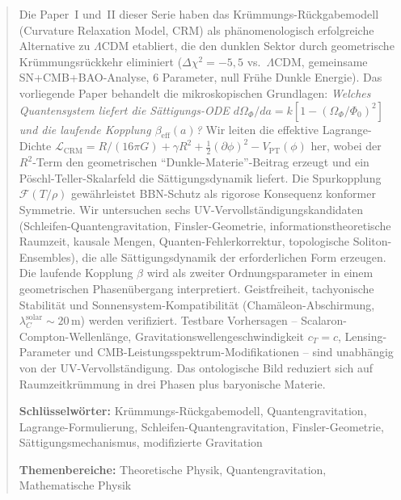 \documentclass[11pt,a4paper]{article}
\begin{document}
\begin{abstract}
\noindent Die Paper~I und~II dieser Serie haben das Kr\"ummungs-R\"uckgabemodell (Curvature Relaxation Model, CRM) als ph\"anomenologisch erfolgreiche Alternative zu $\Lambda$CDM etabliert, die den dunklen Sektor durch geometrische Kr\"ummungsr\"uckkehr eliminiert ($\Delta\chi^2 = -5{,}5$ vs.\ $\Lambda$CDM, gemeinsame SN+CMB+BAO-Analyse, 6 Parameter, null Fr\"uhe Dunkle Energie). Das vorliegende Paper behandelt die mikroskopischen Grundlagen: \textit{Welches Quantensystem liefert die S\"attigungs-ODE $d\Omega_\Phi/da = k[1-(\Omega_\Phi/\Phi_0)^2]$ und die laufende Kopplung $\beta_{\mathrm{eff}}(a)$?} Wir leiten die effektive Lagrange-Dichte $\mathcal{L}_{\mathrm{CRM}} = R/(16\pi G) + \gamma R^2 + \frac{1}{2}(\partial\phi)^2 - V_{\mathrm{PT}}(\phi)$ her, wobei der $R^2$-Term den geometrischen ``Dunkle-Materie''-Beitrag erzeugt und ein P\"oschl-Teller-Skalarfeld die S\"attigungsdynamik liefert. Die Spurkopplung $\mathcal{F}(T/\rho)$ gew\"ahrleistet BBN-Schutz als rigorose Konsequenz konformer Symmetrie. Wir untersuchen sechs UV-Vervollst\"andigungskandidaten (Schleifen-Quantengravitation, Finsler-Geometrie, informationstheoretische Raumzeit, kausale Mengen, Quanten-Fehlerkorrektur, topologische Soliton-Ensembles), die alle S\"attigungsdynamik der erforderlichen Form erzeugen. Die laufende Kopplung $\beta$ wird als zweiter Ordnungsparameter in einem geometrischen Phasen\"ubergang interpretiert. Geistfreiheit, tachyonische Stabilit\"at und Sonnensystem-Kompatibilit\"at (Cham\"aleon-Abschirmung, $\lambda_C^{\mathrm{solar}} \sim 20$\,m) werden verifiziert. Testbare Vorhersagen -- Scalaron-Compton-Wellenl\"ange, Gravitationswellengeschwindigkeit $c_T = c$, Lensing-Parameter und CMB-Leistungsspektrum-Modifikationen -- sind unabh\"angig von der UV-Vervollst\"andigung. Das ontologische Bild reduziert sich auf Raumzeitkr\"ummung in drei Phasen plus baryonische Materie.

\vspace{0.5em}
\noindent \textbf{Schl\"usselw\"orter:} Kr\"ummungs-R\"uckgabemodell, Quantengravitation, Lagrange-Formulierung, Schleifen-Quantengravitation, Finsler-Geometrie, S\"attigungsmechanismus, modifizierte Gravitation

\vspace{0.5em}
\noindent \textbf{Themenbereiche:} Theoretische Physik, Quantengravitation, Mathematische Physik
\end{abstract}

\newpage
\tableofcontents
\newpage
\end{document}
